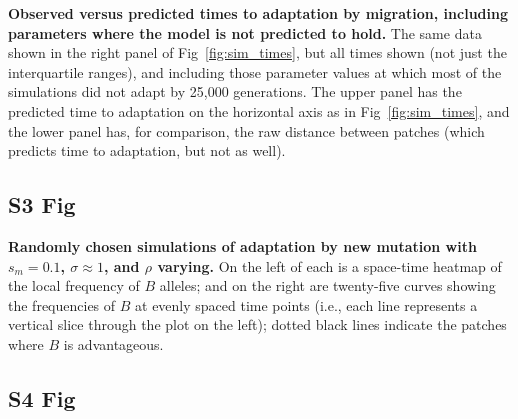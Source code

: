 \documentclass[10pt,letterpaper]{article}
\begin{document}
      \textbf{Observed versus predicted times to adaptation by migration, 
      including parameters where the model is not predicted to hold.}
    The same data shown in the right panel of Fig~\ref{fig:sim_times},
    but all times shown (not just the interquartile ranges),
    and including those parameter values at which most of the simulations did not adapt by 25,000 generations.
    The upper panel has the predicted time to adaptation on the horizontal axis as in Fig~\ref{fig:sim_times},
    and the lower panel has, for comparison, the raw distance between patches 
    (which predicts time to adaptation, but not as well).


\subsection*{S3 Fig}
\label{sfig:sims_1}

\textbf{Randomly chosen simulations of adaptation by new mutation
with $s_m=0.1$, $\sigma\approx 1$, and $\rho$ varying.}
    On the left of each is a space-time heatmap of the local frequency of $B$ alleles;
    and on the right are twenty-five curves showing the frequencies of $B$ at evenly spaced time points
    (i.e., each line represents a vertical slice through the plot on the left);
    dotted black lines indicate the patches where $B$ is advantageous.



\subsection*{S4 Fig}
\label{sfig:sims_2}
\end{document}

